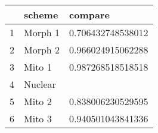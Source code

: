 \begin{table}[ht]
\centering
\begin{tabular}{rll}
  \hline
 & scheme & compare \\ 
  \hline
1 & Morph 1 & 0.706432748538012 \\ 
  2 & Morph 2 & 0.966024915062288 \\ 
  3 & Mito 1 & 0.987268518518518 \\ 
  4 & Nuclear &  \\ 
  5 & Mito 2 & 0.838006230529595 \\ 
  6 & Mito 3 & 0.940501043841336 \\ 
   \hline
\end{tabular}
\label{mmdif}
\end{table}
